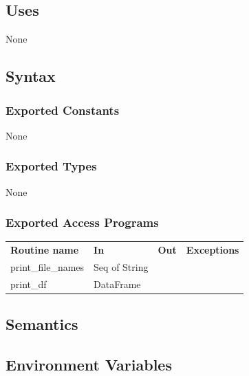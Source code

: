 \documentclass[12pt]{article}
\begin{document}
\subsection* {Uses}

None

\subsection* {Syntax}

\subsubsection* {Exported Constants}

None

\subsubsection* {Exported Types}

None

\subsubsection* {Exported Access Programs}

\begin{tabular}{| l | l | l | p{5cm} |}
  \hline
  \textbf{Routine name} & \textbf{In} & \textbf{Out} & \textbf{Exceptions}\\
  print\_file\_names & Seq of String & & \\
  \hline
  print\_df & DataFrame & & \\
  \hline
\end{tabular}

\subsection* {Semantics}

\subsection*{Environment Variables}
\end{document}
